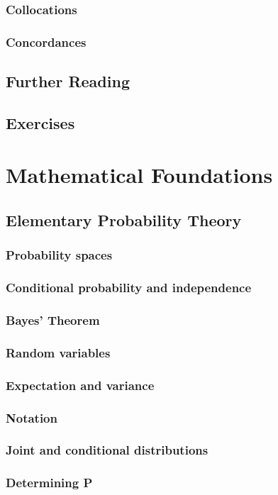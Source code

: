 \documentclass[a4paper]{article}
\begin{document}
\subsubsection{Collocations}
\subsubsection{Concordances}
\subsection{Further Reading}
\subsection{Exercises}
\newpage
\section{Mathematical Foundations}
\subsection{Elementary Probability Theory}
\subsubsection{Probability spaces}
\subsubsection{Conditional probability and independence}
\subsubsection{Bayes' Theorem}
\subsubsection{Random variables}
\subsubsection{Expectation and variance}
\subsubsection{Notation}
\subsubsection{Joint and conditional distributions}
\subsubsection{Determining P}
\end{document}
